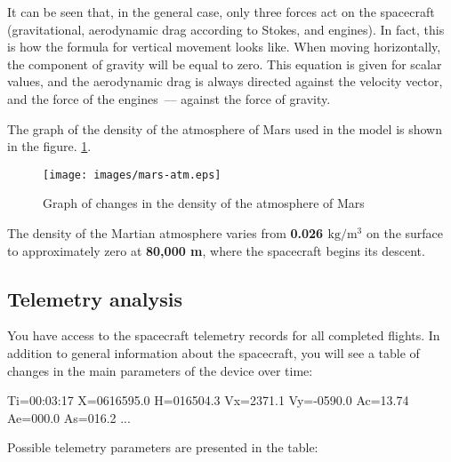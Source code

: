 \documentclass[12pt,a4paper]{article}
\begin{document}
It can be seen that, in the general case, only three forces act on the spacecraft (gravitational, aerodynamic drag according to Stokes, and engines). In fact, this is how the formula for vertical movement looks like. When moving horizontally, the component of gravity will be equal to zero. This equation is given for scalar values, and the aerodynamic drag is always directed against the velocity vector, and the force of the engines~--- against the force of gravity.

The graph of the density of the atmosphere of Mars used in the model is shown in the figure.
\ref{Pic:mars_atmosphere}.

\begin{figure}[tbh]
  \begin{center}
    \texttt{[image: images/mars-atm.eps]}
    \caption{Graph of changes in the density of the atmosphere of Mars}
    \label{Pic:mars_atmosphere}
  \end{center}
\end{figure}

The density of the Martian atmosphere varies from \textbf{0.026 $\text{kg}/\text{m}^3$} on the surface to approximately zero at \textbf{80,000 m}, where the spacecraft begins its descent.

\subsection{Telemetry analysis}

You have access to the spacecraft telemetry records for all completed flights. In addition to general information about the spacecraft, you will see a table of changes in the main parameters of the device over time:

\begin{verbatim*}
Ti=00:03:17 X=0616595.0 H=016504.3 Vx=2371.1 Vy=-0590.0
 Ac=13.74 Ae=000.0 As=016.2
...
\end{verbatim*}

Possible telemetry parameters are presented in the table:
\end{document}
